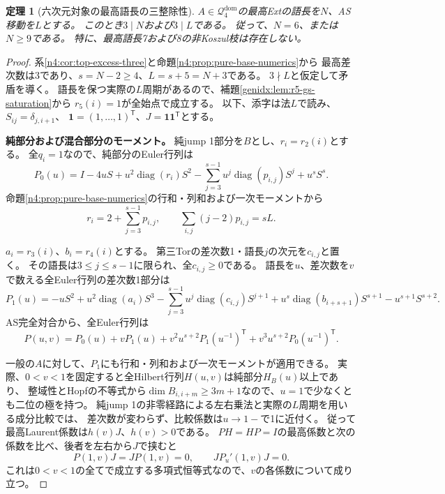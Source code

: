 \documentclass[11pt,a4paper]{ltjsarticle}
\newtheorem{theorem}{定理}[section]
\theoremstyle{definition}
\begin{document}
\begin{theorem}[六次元対象の最高語長の三整除性]
\label{n4:thm:top-word-divisible-three}
$A\in\mathcal Q_4^{\mathrm{dom}}$の最高Extの語長を$N$、AS移動を$L$とする。
このとき$3\mid N$および$3\mid L$である。
従って、$N=6$、または$N\ge9$である。
特に、最高語長7および8の非Koszul枝は存在しない。
\end{theorem}
\begin{proof}
系\ref{n4:cor:top-excess-three}と命題\ref{n4:prop:pure-base-numerics}から
最高差次数は3であり、$s=N-2\ge4$、$L=s+5=N+3$である。
$3\nmid L$と仮定して矛盾を導く。
語長を保つ実際の$L$周期があるので、補題\ref{genidx:lem:r5-gs-saturation}から
$r_5(i)=1$が全始点で成立する。
以下、添字は法$L$で読み、$S_{ij}=\delta_{j,i+1}$、
$\boldsymbol1=(1,\ldots,1)^{\mathsf T}$、$J=\boldsymbol1\boldsymbol1^{\mathsf T}$とする。

\par\smallskip\noindent\textbf{純部分および混合部分のモーメント。}\quad
純jump 1部分を$B$とし、$r_i=r_2(i)$とする。
全$q_i=1$なので、純部分のEuler行列は
\[
 P_0(u)=I-4uS+u^2\operatorname{diag}(r_i)S^2
 -\sum_{j=3}^{s-1}u^j\operatorname{diag}(p_{i,j})S^j+u^sS^s.
\]
命題\ref{n4:prop:pure-base-numerics}の行和・列和および一次モーメントから
\begin{equation}\label{n4:eq:div3-pure-moments}
 r_i=2+\sum_{j=3}^{s-1}p_{i,j},\qquad
 \sum_{i,j}(j-2)p_{i,j}=sL.
\end{equation}

$a_i=r_3(i)$、$b_i=r_4(i)$とする。
第三Torの差次数1・語長$j$の次元を$c_{i,j}$と置く。
その語長は$3\le j\le s-1$に限られ、全$c_{i,j}\ge0$である。
語長を$u$、差次数を$v$で数える全Euler行列の差次数1部分は
\[
 P_1(u)=-uS^2+u^2\operatorname{diag}(a_i)S^3
 -\sum_{j=3}^{s-1}u^j\operatorname{diag}(c_{i,j})S^{j+1}
 +u^s\operatorname{diag}(b_{i+s+1})S^{s+1}-u^{s+1}S^{s+2}.
\]
AS完全対合から、全Euler行列は
\begin{equation}\label{n4:eq:div3-full-euler}
 P(u,v)=P_0(u)+vP_1(u)
 +v^2u^{s+2}P_1(u^{-1})^{\mathsf T}
 +v^3u^{s+2}P_0(u^{-1})^{\mathsf T}.
\end{equation}

一般の$A$に対して、$P_1$にも行和・列和および一次モーメントが適用できる。
実際、$0<v<1$を固定すると全Hilbert行列$H(u,v)$は純部分$H_B(u)$以上であり、
整域性とHopfの不等式から$\dim B_{i,i+m}\ge3m+1$なので、$u=1$で少なくとも二位の極を持つ。
純jump 1の非零経路による左右乗法と実際の$L$周期を用いる成分比較では、
差次数が変わらず、比較係数は$u\to1-$で1に近付く。
従って最高Laurent係数は$h(v)J$、$h(v)>0$である。
$PH=HP=I$の最高係数と次の係数を比べ、後者を左右から$J$で挟むと
\[
 P(1,v)J=JP(1,v)=0,\qquad JP_u'(1,v)J=0.
\]
これは$0<v<1$の全てで成立する多項式恒等式なので、$v$の各係数について成り立つ。


\end{proof}
\end{document}
